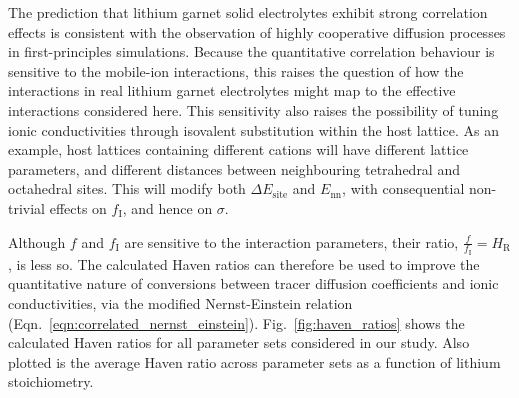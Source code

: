 \documentclass[aps,prb,twocolumn,superscriptaddress,reprint]{revtex4-1}
\newcommand{\m}[1]{\mathrm{#1}}
\begin{document}
The prediction that lithium garnet solid electrolytes exhibit strong correlation effects is consistent with the observation of highly cooperative diffusion processes in first-principles simulations.\cite{JalemEtAl_ChemMater2013, MeierEtAl_JPhysChemC2014} Because the quantitative correlation behaviour is sensitive to the mobile-ion interactions, this raises the question of how the interactions in real lithium garnet electrolytes might map to the effective interactions considered here. This sensitivity also raises the possibility of tuning ionic conductivities through isovalent substitution within the host lattice. As an example, host lattices containing different  cations will have different lattice parameters, and different distances between neighbouring tetrahedral and octahedral sites. This will modify both $\Delta E_\m{site}$ and $E_\m{nn}$, with consequential non-trivial effects on $f_\m{I}$, and hence on $\sigma$. 

Although $f$ and $f_\m{I}$ are sensitive to the interaction parameters, their ratio, $\frac{f}{f_\m{I}}=H_\m{R}$, is less so. The calculated Haven ratios can therefore be used to improve the quantitative nature of conversions between tracer diffusion coefficients and ionic conductivities, via the modified Nernst-Einstein relation (Eqn.~\ref{eqn:correlated_nernst_einstein}). Fig.~\ref{fig:haven_ratios} shows the calculated Haven ratios for all parameter sets considered in our study. Also plotted is the average Haven ratio across parameter sets as a function of lithium stoichiometry.
\end{document}
